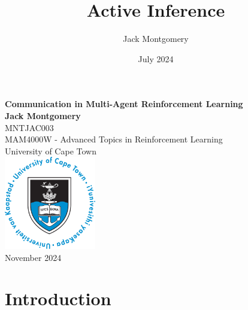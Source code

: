 \documentclass{article}
\title{Active Inference}
\author{Jack Montgomery}
\date{July 2024}
\begin{document}
\begin{titlepage}
    \centering
    \vspace*{1in}
    
    {\LARGE \textbf{Communication in Multi-Agent Reinforcement Learning}}\\[2cm]
    
    {\large \textbf{Jack Montgomery}}\\[0.5cm]
    {\large MNTJAC003}\\[0.5cm]
    {\large MAM4000W - Advanced Topics in Reinforcement Learning}\\ [0.5cm]
    {\large University of Cape Town}\\[2cm]
    
    \includegraphics[width=0.3\textwidth]{images/UCT_logo_circular_blue_large.png}\\[2cm]
    
    {\large November 2024}\\[2.5cm]
    
    \begin{abstract}

    \end{abstract}
    
\end{titlepage}

\newpage

\tableofcontents

\newpage

\section{Introduction}
\end{document}
